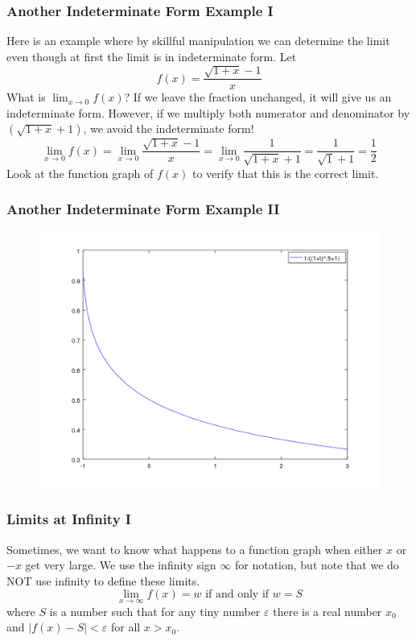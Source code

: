 \documentclass[xcolor=dvipsnames]{beamer}
\begin{document}
\begin{frame}
  \frametitle{Another Indeterminate Form Example I}
  Here is an example where by skillful manipulation we can determine
  the limit even though at first the limit is in indeterminate form.
  Let
\begin{equation}
  \label{eq:xierigai}
  f(x)=\frac{\sqrt{1+x}-1}{x}
\end{equation}
What is $\lim_{x\rightarrow{}0}f(x)$? If we leave the fraction
unchanged, it will give us an indeterminate form. However, if we
multiply both numerator and denominator by $(\sqrt{1+x}+1)$, we avoid
the indeterminate form!
\begin{equation}
  \label{eq:ciabohmi}
  \lim_{x\rightarrow{}0}f(x)=\lim_{x\rightarrow{}0}\frac{\sqrt{1+x}-1}{x}=\lim_{x\rightarrow{}0}\frac{1}{\sqrt{1+x}+1}=\frac{1}{\sqrt{1}+1}=\frac{1}{2}
\end{equation}
Look at the function graph of $f(x)$ to verify that this is the
correct limit.
\end{frame}

\begin{frame}
  \frametitle{Another Indeterminate Form Example II}
  \begin{figure}[h]
    \includegraphics[scale=.5]{./indeterminate.png}
  \end{figure}
\end{frame}

\begin{frame}
  \frametitle{Limits at Infinity I}
Sometimes, we want to know what happens to a function graph when
either $x$ or $-x$ get very large. We use the infinity sign $\infty$
for notation, but note that we do NOT use infinity to define these
limits. 
\begin{equation}
  \label{eq:xetieshe}
  \lim_{x\rightarrow{}\infty}f(x)=w\mbox{ if and only if }w=S
\end{equation}
where $S$ is a number such that for any tiny number $\varepsilon$
there is a real number $x_{0}$ and
$\vert{}f(x)-S\vert<\varepsilon$ for all $x>x_{0}$.
\end{frame}
\end{document}
